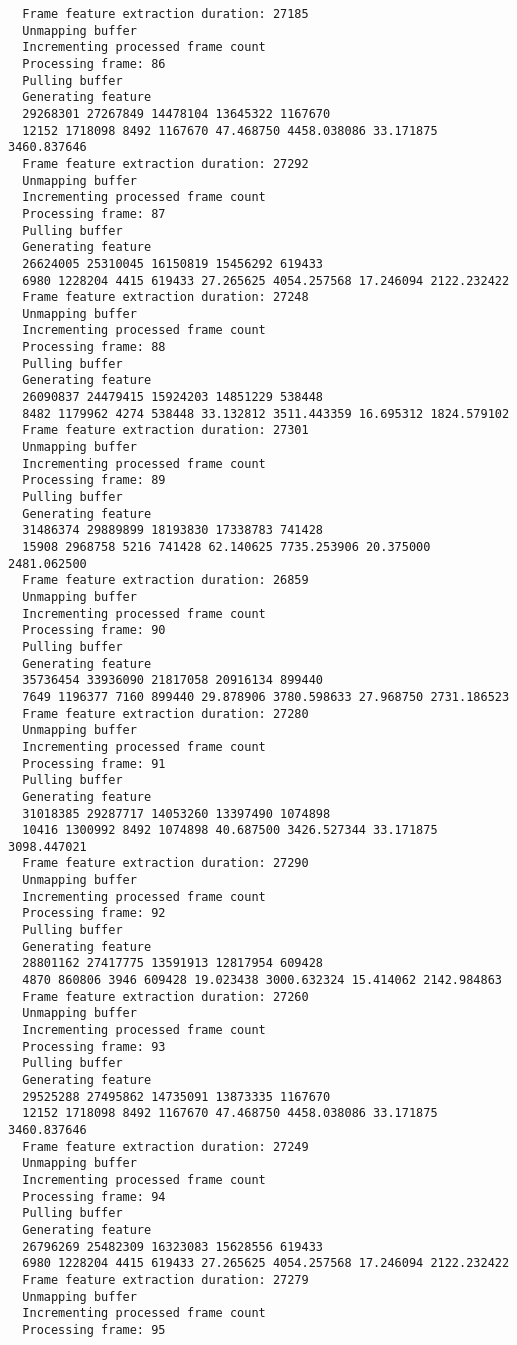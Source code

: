 \documentclass[12pt,oneside]{book}
\begin{document}
\begin{lstlisting}
  Frame feature extraction duration: 27185
  Unmapping buffer
  Incrementing processed frame count
  Processing frame: 86
  Pulling buffer
  Generating feature
  29268301 27267849 14478104 13645322 1167670
  12152 1718098 8492 1167670 47.468750 4458.038086 33.171875 3460.837646
  Frame feature extraction duration: 27292
  Unmapping buffer
  Incrementing processed frame count
  Processing frame: 87
  Pulling buffer
  Generating feature
  26624005 25310045 16150819 15456292 619433
  6980 1228204 4415 619433 27.265625 4054.257568 17.246094 2122.232422
  Frame feature extraction duration: 27248
  Unmapping buffer
  Incrementing processed frame count
  Processing frame: 88
  Pulling buffer
  Generating feature
  26090837 24479415 15924203 14851229 538448
  8482 1179962 4274 538448 33.132812 3511.443359 16.695312 1824.579102
  Frame feature extraction duration: 27301
  Unmapping buffer
  Incrementing processed frame count
  Processing frame: 89
  Pulling buffer
  Generating feature
  31486374 29889899 18193830 17338783 741428
  15908 2968758 5216 741428 62.140625 7735.253906 20.375000 2481.062500
  Frame feature extraction duration: 26859
  Unmapping buffer
  Incrementing processed frame count
  Processing frame: 90
  Pulling buffer
  Generating feature
  35736454 33936090 21817058 20916134 899440
  7649 1196377 7160 899440 29.878906 3780.598633 27.968750 2731.186523
  Frame feature extraction duration: 27280
  Unmapping buffer
  Incrementing processed frame count
  Processing frame: 91
  Pulling buffer
  Generating feature
  31018385 29287717 14053260 13397490 1074898
  10416 1300992 8492 1074898 40.687500 3426.527344 33.171875 3098.447021
  Frame feature extraction duration: 27290
  Unmapping buffer
  Incrementing processed frame count
  Processing frame: 92
  Pulling buffer
  Generating feature
  28801162 27417775 13591913 12817954 609428
  4870 860806 3946 609428 19.023438 3000.632324 15.414062 2142.984863
  Frame feature extraction duration: 27260
  Unmapping buffer
  Incrementing processed frame count
  Processing frame: 93
  Pulling buffer
  Generating feature
  29525288 27495862 14735091 13873335 1167670
  12152 1718098 8492 1167670 47.468750 4458.038086 33.171875 3460.837646
  Frame feature extraction duration: 27249
  Unmapping buffer
  Incrementing processed frame count
  Processing frame: 94
  Pulling buffer
  Generating feature
  26796269 25482309 16323083 15628556 619433
  6980 1228204 4415 619433 27.265625 4054.257568 17.246094 2122.232422
  Frame feature extraction duration: 27279
  Unmapping buffer
  Incrementing processed frame count
  Processing frame: 95

\end{lstlisting}
\end{document}
